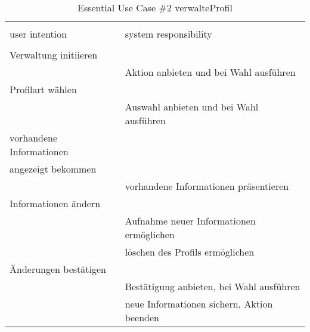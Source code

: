 \begin{table}[H]
\caption{Essential Use Case \#2 verwalteProfil }
\centering
\begin{tabular}{l l}
\\ [-0.5ex]

\hline\hline
\\ [-0.5ex]
user intention & system responsibility
\\ [1.5ex]
\hline
\\ [-0.5ex]
Verwaltung initiieren      &                                 \\[1ex]
                     & Aktion anbieten und bei Wahl ausführen     \\[1ex]
Profilart wählen        &                                 \\[1ex]
                     & Auswahl anbieten und bei Wahl ausführen  \\[1ex]             
vorhandene Informationen   &                                 \\[1ex]
angezeigt bekommen         &                                 \\[1ex]
                     & vorhandene Informationen präsentieren      \\[1ex] 
Informationen ändern       &                                 \\[1ex] 
                     & Aufnahme neuer Informationen ermöglichen    \\[1ex]
                     & löschen des Profils ermöglichen          \\[1ex]
Änderungen bestätigen      &                                 \\[1ex]
                     & Bestätigung anbieten, bei Wahl ausführen   \\[1ex]
                     & neue Informationen sichern, Aktion beenden \\[1ex]

\hline
\end{tabular}
\label{tab:profilverwalten}
\end{table}



